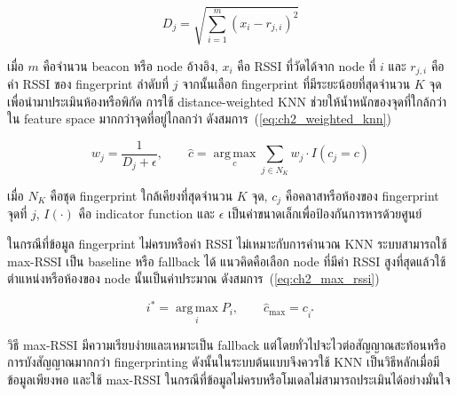 \begin{equation}
    D_j = \sqrt{\sum_{i=1}^{m}(x_i-r_{j,i})^2}
    \label{eq:ch2_knn_rssi_distance}
\end{equation}

เมื่อ $m$ คือจำนวน beacon หรือ node อ้างอิง, $x_i$ คือ RSSI ที่วัดได้จาก node ที่ $i$ และ $r_{j,i}$ คือค่า RSSI ของ fingerprint ลำดับที่ $j$ จากนั้นเลือก fingerprint ที่มีระยะน้อยที่สุดจำนวน $K$ จุด เพื่อนำมาประเมินห้องหรือพิกัด การใช้ distance-weighted KNN ช่วยให้น้ำหนักของจุดที่ใกล้กว่าใน feature space มากกว่าจุดที่อยู่ไกลกว่า ดังสมการ~(\ref{eq:ch2_weighted_knn})

\begin{equation}
    w_j = \frac{1}{D_j+\epsilon}, \qquad
    \hat{c} = \operatorname*{arg\,max}_{c} \sum_{j \in N_K} w_j \cdot I(c_j=c)
    \label{eq:ch2_weighted_knn}
\end{equation}

เมื่อ $N_K$ คือชุด fingerprint ใกล้เคียงที่สุดจำนวน $K$ จุด, $c_j$ คือคลาสหรือห้องของ fingerprint จุดที่ $j$, $I(\cdot)$ คือ indicator function และ $\epsilon$ เป็นค่าขนาดเล็กเพื่อป้องกันการหารด้วยศูนย์

ในกรณีที่ข้อมูล fingerprint ไม่ครบหรือค่า RSSI ไม่เหมาะกับการคำนวณ KNN ระบบสามารถใช้ max-RSSI เป็น baseline หรือ fallback ได้ แนวคิดคือเลือก node ที่มีค่า RSSI สูงที่สุดแล้วใช้ตำแหน่งหรือห้องของ node นั้นเป็นค่าประมาณ ดังสมการ~(\ref{eq:ch2_max_rssi})

\begin{equation}
    i^{*} = \operatorname*{arg\,max}_{i} P_i, \qquad
    \hat{c}_{\mathrm{max}} = c_{i^{*}}
    \label{eq:ch2_max_rssi}
\end{equation}

วิธี max-RSSI มีความเรียบง่ายและเหมาะเป็น fallback แต่โดยทั่วไปจะไวต่อสัญญาณสะท้อนหรือการบังสัญญาณมากกว่า fingerprinting ดังนั้นในระบบต้นแบบจึงควรใช้ KNN เป็นวิธีหลักเมื่อมีข้อมูลเพียงพอ และใช้ max-RSSI ในกรณีที่ข้อมูลไม่ครบหรือโมเดลไม่สามารถประเมินได้อย่างมั่นใจ

